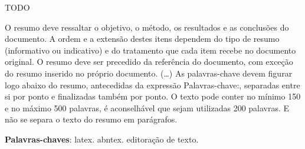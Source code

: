 \begin{resumo}

  TODO

  O resumo deve ressaltar o objetivo, o método, os resultados e as conclusões
  do documento. A ordem e a extensão
  destes itens dependem do tipo de resumo (informativo ou indicativo) e do
  tratamento que cada item recebe no documento original. O resumo deve ser
  precedido da referência do documento, com exceção do resumo inserido no
  próprio documento. (\ldots) As palavras-chave devem figurar logo abaixo do
  resumo, antecedidas da expressão Palavras-chave:, separadas entre si por
  ponto e finalizadas também por ponto. O texto pode conter no mínimo 150 e
  no máximo 500 palavras, é aconselhável que sejam utilizadas 200 palavras.
  E não se separa o texto do resumo em parágrafos.

 \vspace{\onelineskip}

 \noindent
 \textbf{Palavras-chaves}: latex. abntex. editoração de texto.
\end{resumo}
